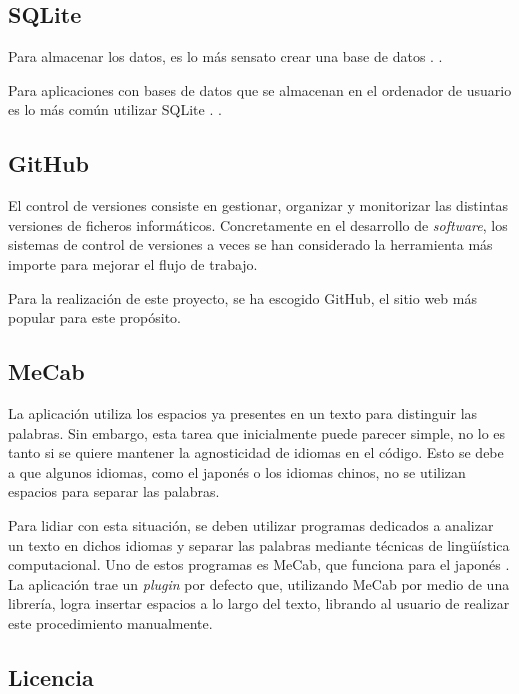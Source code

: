 \subsection{SQLite}

Para almacenar los datos, es lo más sensato crear una base de datos \citationNeeded. .

Para aplicaciones con bases de datos que se almacenan en el ordenador de usuario es lo más común utilizar SQLite \citationNeeded. .

\subsection{GitHub}

El control de versiones consiste en gestionar, organizar y monitorizar las distintas versiones de ficheros informáticos. Concretamente en el desarrollo de \textit{software}, los sistemas de control de versiones a veces se han considerado la herramienta más importe para mejorar el flujo de trabajo. \autocite{1504674}

Para la realización de este proyecto, se ha escogido GitHub, el sitio web más popular para este propósito.

\subsection{MeCab}

La aplicación utiliza los espacios ya presentes en un texto para distinguir las palabras. Sin embargo, esta tarea que inicialmente puede parecer simple, no lo es tanto si se quiere mantener la agnosticidad de idiomas en el código. Esto se debe a que algunos idiomas, como el japonés o los idiomas chinos, no se utilizan espacios para separar las palabras.

Para lidiar con esta situación, se deben utilizar programas dedicados a analizar un texto en dichos idiomas y separar las palabras mediante técnicas de lingüística computacional. Uno de estos programas es MeCab, que funciona para el japonés \todo[referencia]. La aplicación trae un \textit{plugin} por defecto que, utilizando MeCab por medio de una librería, logra insertar espacios a lo largo del texto, librando al usuario de realizar este procedimiento manualmente.

\subsection{Licencia}

